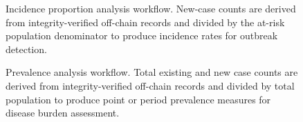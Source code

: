 \documentclass[AMA,LATO1COL]{WileyNJD-v2}
\begin{document}
\begin{figure}[!ht]
\centering
{}
\caption{Incidence proportion analysis workflow. New-case counts are derived from integrity-verified off-chain records and divided by the at-risk population denominator to produce incidence rates for outbreak detection.}\label{fig:incidence}
\end{figure}

%
%
%


\begin{figure}[!ht]
\centering
{}
\caption{Prevalence analysis workflow. Total existing and new case counts are derived from integrity-verified off-chain records and divided by total population to produce point or period prevalence measures for disease burden assessment.}\label{fig:prevalence}
\end{figure}

%
%
%
\end{document}
